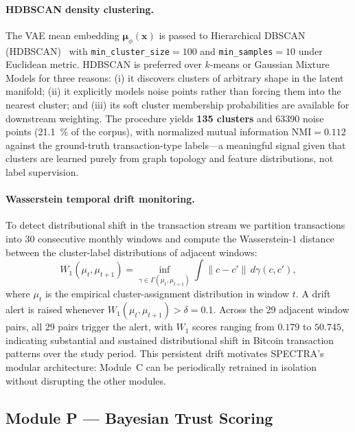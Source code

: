 \paragraph{HDBSCAN density clustering.}
The VAE mean embedding $\boldsymbol{\mu}_\phi(\mathbf{x})$ is passed to
Hierarchical DBSCAN (HDBSCAN)~\cite{campello2013density} with
\texttt{min\_cluster\_size}$= 100$ and \texttt{min\_samples}$= 10$
under Euclidean metric.
HDBSCAN is preferred over $k$-means or Gaussian Mixture Models for three
reasons: (i) it discovers clusters of arbitrary shape in the latent manifold;
(ii) it explicitly models noise points rather than forcing them into the
nearest cluster; and (iii) its soft cluster membership probabilities are
available for downstream weighting.
The procedure yields \textbf{135 clusters} and
\num{63390} noise points (\SI{21.1}{\percent} of the corpus), with
normalized mutual information $\mathrm{NMI} = 0.112$ against the ground-truth
transaction-type labels—a meaningful signal given that clusters are learned
purely from graph topology and feature distributions, not label supervision.

\paragraph{Wasserstein temporal drift monitoring.}
To detect distributional shift in the transaction stream we partition
transactions into 30 consecutive monthly windows and compute the
Wasserstein-$1$ distance~\cite{villani2008optimal} between the cluster-label
distributions of adjacent windows:
\begin{equation}
  W_1(\mu_t, \mu_{t+1})
    = \inf_{\gamma \in \Gamma(\mu_t, \mu_{t+1})}
        \int \|c - c'\| \, d\gamma(c, c'),
  \label{eq:w1}
\end{equation}
where $\mu_t$ is the empirical cluster-assignment distribution in window $t$.
A drift alert is raised whenever $W_1(\mu_t, \mu_{t+1}) > \delta = 0.1$.
Across the 29 adjacent window pairs, all 29 pairs trigger the alert, with
$W_1$ scores ranging from $0.179$ to $50.745$, indicating substantial and
sustained distributional shift in Bitcoin transaction patterns over the
study period.
This persistent drift motivates SPECTRA's modular architecture: Module~C can
be periodically retrained in isolation without disrupting the other modules.

\subsection{Module P — Bayesian Trust Scoring}
\label{sec:module_p}

